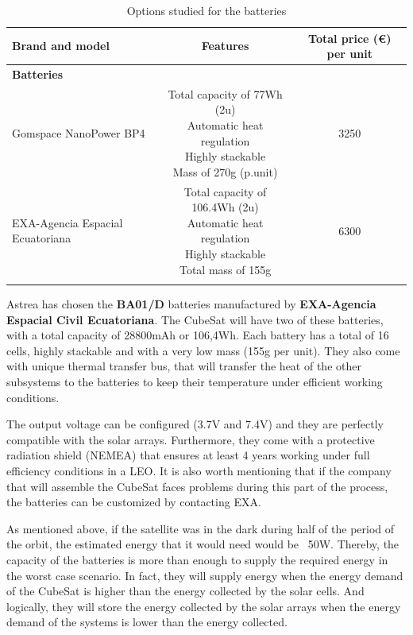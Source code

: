 \begin{longtable}{| p{4cm} | c | c | }
\hline
\rowcolor[gray]{0.80}	\textbf{Brand and model} &  \textbf{Features}     & \textbf{Total price (\euro) per unit}   \\
\hline
\endfirsthead
\rowcolor[gray]{0.85} \textbf{Batteries} &  &  \\
	   Gomspace NanoPower BP4 & \makecell{Total capacity of 77Wh (2u) \\ Automatic heat regulation \\ Highly stackable \\ Mass of 270g (p.unit)} & 3250 \\
	\hline
	EXA-Agencia Espacial Ecuatoriana & \makecell{Total capacity of 106.4Wh (2u)\\ Automatic heat regulation \\ Highly stackable \\ Total mass of 155g} & 6300 \\
	\hline
	
\caption{Options studied for the batteries}
\label{optionsbatteries}
\end{longtable}

Astrea has chosen the \textbf{BA01/D} batteries manufactured by \textbf{EXA-Agencia Espacial Civil Ecuatoriana}. The CubeSat will have two of these batteries, with a total capacity of 28800mAh or 106,4Wh. Each battery has a total of 16 cells, highly stackable and with a very low mass (155g per unit). They also come with unique thermal transfer bus, that will transfer the heat of the other subsystems to the batteries to keep their temperature under efficient working conditions.

The output voltage can be configured (3.7V and 7.4V) and they are perfectly compatible with the solar arrays. Furthermore, they come with a protective radiation shield (NEMEA) that ensures at least 4 years working under full efficiency conditions in a LEO. It is also worth mentioning that if the company that will assemble the CubeSat faces problems during this part of the process, the batteries can be customized by contacting EXA.

As mentioned above, if the satellite was in the dark during half of the period of the orbit, the estimated energy that it would need would be ~50W. Thereby, the capacity of the batteries is more than enough to supply the required energy in the worst case scenario. In fact, they will supply energy when the energy demand of the CubeSat is higher than the energy collected by the solar cells. And logically, they will store the energy collected by the solar arrays when the energy demand of the systems is lower than the energy collected.